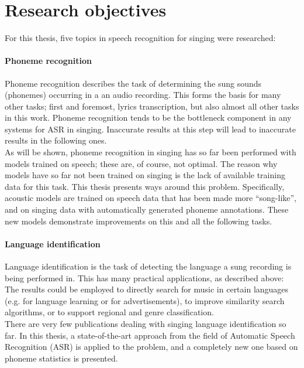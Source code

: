 \section{Research objectives}
For this thesis, five topics in speech recognition for singing were researched:

\paragraph{Phoneme recognition}
Phoneme recognition describes the task of determining the sung sounds (phonemes) occurring in a an audio recording. This forms the basis for many other tasks; first and foremost, lyrics transcription, but also almost all other tasks in this work. Phoneme recognition tends to be the bottleneck component in any systems for ASR in singing. Inaccurate results at this step will lead to inaccurate results in the following ones.\\
As will be shown, phoneme recognition in singing has so far been performed with models trained on speech; these are, of course, not optimal. The reason why models have so far not been trained on singing is the lack of available training data for this task. This thesis presents ways around this problem. Specifically, acoustic models are trained on speech data that has been made more ``song-like'', and on singing data with automatically generated phoneme annotations. These new models demonstrate improvements on this and all the following tasks.

\paragraph{Language identification}
Language identification is the task of detecting the language a sung recording is being performed in. This has many practical applications, as described above: The results could be employed to directly search for music in certain languages (e.g. for language learning or for advertisements), to improve similarity search algorithms, or to support regional and genre classification.\\
There are very few publications dealing with singing language identification so far. In this thesis, a state-of-the-art approach from the field of Automatic Speech Recognition (ASR) is applied to the problem, and a completely new one based on phoneme statistics is presented.

